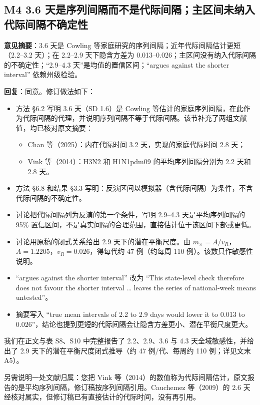 \documentclass[UTF8,a4paper,11pt,fontset=none]{ctexart}
\providecommand{\tightlist}{\setlength{\itemsep}{1pt}\setlength{\parskip}{0pt}}
\begin{document}
\subsection*{M4 3.6 天是序列间隔而不是代际间隔；主区间未纳入代际间隔不确定性}

\textbf{意见摘要}：3.6 天是 Cowling 等家庭研究的序列间隔；近年代际间隔估计更短（2.2--3.2 天）；在 2.2--2.9 天下隐含方差为 0.013--0.026；主区间没有纳入代际间隔的不确定性；``2.9--4.3 天''是均值的置信区间；``argues against the shorter interval'' 依赖州级检验。

\textbf{回复}：同意。修订做法如下：

\begin{itemize}
\tightlist
\item
  方法 §6.2 写明 3.6 天（SD 1.6）是 Cowling 等估计的家庭序列间隔，在此作为代际间隔的代理，并说明序列间隔不等于代际间隔。该节补充了两组文献值，均已核对原文摘要：

  \begin{itemize}
  \tightlist
  \item
    Chan 等（2025）：内在代际时间 3.2 天，实现的家庭代际时间 2.8 天；
  \item
    Vink 等（2014）：H3N2 和 H1N1pdm09 的平均序列间隔分别为 2.2 天和 2.8 天。
  \end{itemize}
\item
  方法 §6.8 和结果 §3.3 写明：反演区间以模拟器（含代际间隔）为条件，不含代际间隔的不确定性。
\item
  讨论把代际间隔列为反演的第一个条件，写明 2.9--4.3 天是平均序列间隔的 95\% 置信区间，不是真实间隔的合理范围，直接估计位于该区间下部或更低。
\item
  讨论用原稿的闭式关系给出 2.9 天下的潜在平衡尺度。由 \(m_\times=A/v_R\)，\(A=1.2205\)，\(v_R=0.026\)，得每代约 47 例（约每周 110 例）。该数只作敏感性说明。
\item
  ``argues against the shorter interval'' 改为 ``This state-level check therefore does not favour the shorter interval \ldots{} leaves the series of national-week means untested''。
\item
  摘要写入 ``true mean intervals of 2.2 to 2.9 days would lower it to 0.013 to 0.026''，结论也提到更短的代际间隔会让隐含方差更小、潜在平衡尺度更大。
\end{itemize}

我们在正文与表 S8、S10 中完整报告了 2.2、2.9、3.6 与 4.3 天全域敏感性，并给出了 2.9 天下的潜在平衡尺度闭式推导（约 47 例/代、每周约 110 例；详见文末 A5）。

另需说明一处文献归属：您把 Vink 等（2014）的数值称为代际间隔估计，原文报告的是平均序列间隔，修订稿按序列间隔引用。Cauchemez 等（2009）的 2.6 天经核对属实，但修订稿已有直接估计的代际时间，没有再引用。
\end{document}
